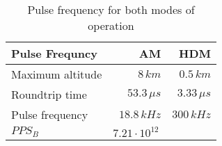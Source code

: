\begin{table}[H]
\centering
\caption{Pulse frequency for both modes of operation}
\label{tab:f_pulse}
\begin{tabular}{|l|rr|}\hline
    \textbf{Pulse Frequncy} & AM & HDM \\
    \hline 
    Maximum altitude & $8\,km$ & $0.5\,km$ \\
    Roundtrip time & $53.3\,\mu s$ & $3.33\,\mu s$ \\
    Pulse frequency & $18.8\,kHz$ & $300\,kHz$ \\
    $PPS_B$ & $7.21\cdot10^{12}\,$ & \\
    \hline 
\end{tabular}
\end{table}
